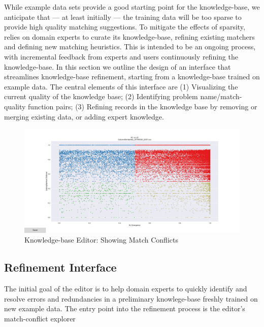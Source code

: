 
While example data sets provide a good starting point for the \systemname knowledge-base, we anticipate that --- at least initially --- the training data will be too sparse to provide high quality matching suggestions.
To mitigate the effects of sparsity, \systemname relies on domain experts to curate its knowledge-base, refining existing matchers and defining new matching heuristics.
This is intended to be an ongoing process, with incremental feedback from experts and users continuously refining the knowledge-base.
In this section we outline the design of an interface that streamlines knowledge-base refinement, starting from a knowledge-base trained on example data.
The central elements of this interface are 
(1) Visualizing the current quality of the knowledge base;
(2) Identifying problem name/match-quality function pairs;
(3) Refining records in the knowledge base by removing or merging existing data, or adding expert knowledge.

\begin{figure}
	\centering
	\includegraphics[width=1\columnwidth]{graphics/KBUI}
	\caption{Knowledge-base Editor: Showing Match Conflicts}
	\label{fig:editor:scatterplot}
\end{figure}

\subsection{Refinement Interface}
The initial goal of the \systemname editor is to help domain experts to quickly identify and resolve errors and redundancies in a preliminary knowlege-base freshly trained on new example data.  
The entry point into the refinement process is the \systemname editor's match-conflict explorer


